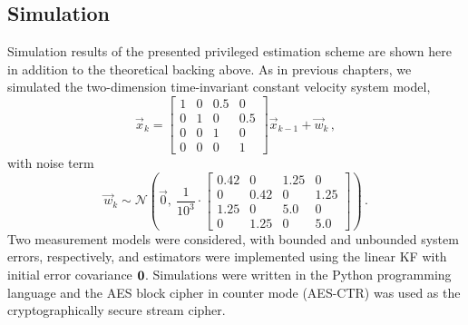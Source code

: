 \subsection{Simulation}\label{subsec:priv_estimation:est_simulation}
Simulation results of the presented privileged estimation scheme are shown here in addition to the theoretical backing above. As in previous chapters, we simulated the two-dimension time-invariant constant velocity system model,
\begin{equation}\label{eq:priv_estimation:est_simulation_system_model}
    \vec{x}_k = 
    \begin{bmatrix}
        1 & 0 & 0.5 & 0\\
        0 & 1 & 0 & 0.5\\
        0 & 0 & 1 & 0\\
        0 & 0 & 0 & 1
    \end{bmatrix}
    \vec{x}_{k-1} + \vec{w}_k\,,
\end{equation}
with noise term
\begin{equation}
    \vec{w}_k \sim \mathcal{N}\left(\vec{0},\ \frac{1}{10^{3}}\cdot
    \begin{bmatrix}
        0.42 & 0 & 1.25 & 0\\
        0 & 0.42 & 0 & 1.25\\
        1.25 & 0 & 5.0 & 0\\
        0 & 1.25 & 0 & 5.0
    \end{bmatrix}
    \right)\,.
\end{equation}
Two measurement models were considered, with bounded and unbounded system errors, respectively, and estimators were implemented using the linear KF with initial error covariance ${{\mathbf{0}}}$. Simulations were written in the Python programming language and the AES block cipher in counter mode (AES-CTR) \cite{gueronIntelAdvancedEncryption2010} was used as the cryptographically secure stream cipher.

